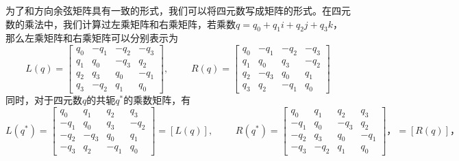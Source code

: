 为了和方向余弦矩阵具有一致的形式，我们可以将四元数写成矩阵的形式。在四元数的乘法中，我们计算过左乘矩阵和右乘矩阵，若乘数$q = q_0 + q_1i +q_2 j +q_3k$，那么左乘矩阵和右乘矩阵可以分别表示为
\begin{equation}
	L(q) = 
	\begin{bmatrix}
		q_0 & -q_1 & -q_2 & -q_3 \\
		q_1 & q_0 & -q_3 & q_2 \\
		q_2 & q_3 & q_0 & -q_1 \\
		q_3 & -q_2 & q_1 & q_0
	\end{bmatrix},
\,\, \qquad 
	R(q) =
	\begin{bmatrix}
		q_0 & -q_1 & -q_2 & -q_3 \\
		q_1 & q_0 & q_3 & -q_2 \\
		q_2 & -q_3 & q_0 & q_1 \\
		q_3 & q_2 & -q_1 & q_0
	\end{bmatrix}
\end{equation}
同时，对于四元数$q$的共轭$q^*$的乘数矩阵，有
\begin{equation}
	L(q^*) =
	\begin{bmatrix}
		q_0 & q_1 & q_2 & q_3 \\
		-q_1 & q_0 & q_3 & -q_2 \\
		-q_2 & -q_3 & q_0 & q_1 \\
		-q_3 & q_2 & -q_1 & q_0
	\end{bmatrix}
	= [L(q)],
	\,\,\qquad 
	R(q^*) =
	\begin{bmatrix}
		q_0 & q_1 & q_2 & q_3 \\
		-q_1 & q_0 & -q_3 & q_2 \\
		-q_2 & q_3 & q_0 & -q_1 \\
		-q_3 & -q_2 & q_1 & q_0
	\end{bmatrix}，
	= [R(q)]，
\end{equation}

